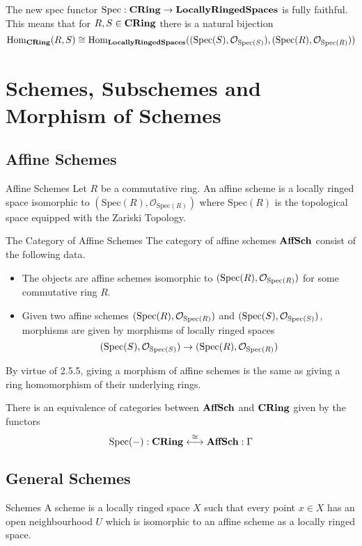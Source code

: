 \documentclass[a4paper]{article}
\begin{document}
\begin{prp}{}{} The new spec functor $\text{Spec}:\bold{CRing}\to\bold{Locally Ringed Spaces}$ is fully faithful. This means that for $R,S\in\bold{CRing}$ there is a natural bijection $$\operatorname{Hom}_\bold{CRing}(R,S)\cong\operatorname{Hom}_\bold{Locally Ringed Spaces}((\text{Spec}(S),\mathcal{O}_{\text{Spec}(S)}),(\text{Spec}(R),\mathcal{O}_{\text{Spec}(R)}))$$
\end{prp}

\pagebreak
\section{Schemes, Subschemes and Morphism of Schemes}
\subsection{Affine Schemes}
\begin{defn}{Affine Schemes}{} Let $R$ be a commutative ring. An affine scheme is a locally ringed space isomorphic to $(\text{Spec}(R),\mathcal{O}_{\text{Spec}(R)})$ where $\text{Spec}(R)$ is the topological space equipped with the Zariski Topology. 
\end{defn}

\begin{defn}{The Category of Affine Schemes}{} The category of affine schemes $\bold{AffSch}$ consist of the following data. 
\begin{itemize}
\item The objects are affine schemes isomorphic to $(\text{Spec}(R),\mathcal{O}_{\text{Spec}(R)})$ for some commutative ring $R$. 
\item Given two affine schemes $(\text{Spec}(R),\mathcal{O}_{\text{Spec}(R)})$ and $(\text{Spec}(S),\mathcal{O}_{\text{Spec}(S)})$, morphisms are given by morphisms of locally ringed spaces $$(\text{Spec}(S),\mathcal{O}_{\text{Spec}(S)})\to(\text{Spec}(R),\mathcal{O}_{\text{Spec}(R)})$$
\end{itemize}
\end{defn}

By virtue of 2.5.5, giving a morphism of affine schemes is the same as giving a ring homomorphism of their underlying rings. 

\begin{prp}{}{} There is an equivalence of categories between $\bold{AffSch}$ and $\bold{CRing}$ given by the functors $$\text{Spec}(-):\bold{CRing}\overset{\cong}{\longleftrightarrow}\bold{AffSch}:\Gamma$$
\end{prp}

\subsection{General Schemes}
\begin{defn}{Schemes}{} A scheme is a locally ringed space $X$ such that every point $x\in X$ has an open neighbourhood $U$ which is isomorphic to an affine scheme as a locally ringed space. 
\end{defn}
\end{document}
